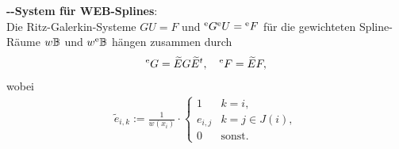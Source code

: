 \textbf{--System für WEB-Splines}:\\
Die Ritz-Galerkin-Systeme $GU = F$ und ${}^{\mathrm{e}} G{}^{\mathrm{e}} U = {}^{\mathrm{e}} F$ für die gewichteten Spline-Räume
$w\mathbb{B}$ und $w^{\mathrm{e}}\mathbb{B}$ hängen zusammen durch
\begin{align*}
    {}^{\mathrm{e}} G = \widetilde{E} G \widetilde{E}^t,\quad
    {}^{\mathrm{e}} F = \widetilde{E} F,
\end{align*}
wobei
\begin{align*}
    \widetilde{e}_{i,k}
    := \frac{1}{w(x_i)} \cdot \begin{cases}1 & k = i,\\e_{i,j} & k = j \in J(i),\\0 & \text{sonst}.
    \end{cases}
\end{align*}

\pagebreak
